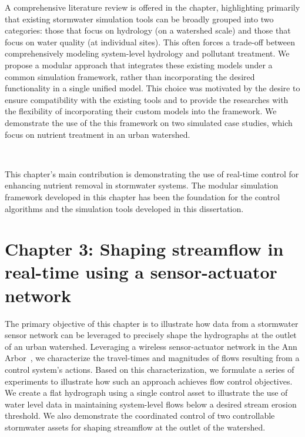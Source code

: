 A comprehensive literature review is offered in the chapter, highlighting primarily that existing stormwater simulation tools can be broadly grouped into two categories: those that focus on hydrology (on a watershed scale)\cite{Rossman2010Storm5.1} and those that focus on water quality (at individual sites)\cite{Langergraber2009CWM1:Wetlands}.
This often forces a trade-off between comprehensively modeling system-level hydrology and pollutant treatment.
We propose a modular approach that integrates these existing models under a common simulation framework, rather than incorporating the desired functionality in a single unified model.
This choice was motivated by the desire to ensure compatibility with the existing tools and to provide the researches with the flexibility of incorporating their custom models into the framework.
We demonstrate the use of the this framework on two simulated case studies, which focus on nutrient treatment in an urban watershed.

\

This chapter's main contribution is demonstrating the use of real-time control for enhancing nutrient removal in stormwater systems.
The modular simulation framework developed in this chapter has been the foundation for the control algorithms and the simulation tools developed in this dissertation. 

\section{Chapter 3: Shaping streamflow in real-time using a sensor-actuator network}

The primary objective of this chapter is to illustrate how data from a stormwater sensor network can be leveraged to precisely shape the hydrographs at the outlet of an urban watershed.
Leveraging a wireless sensor-actuator network in the Ann Arbor~\cite{Bartos_2018}, we characterize the travel-times and magnitudes of flows resulting from a control system's actions.
Based on this characterization, we formulate a series of experiments to illustrate how such an approach achieves flow control objectives.
We create a flat hydrograph using a single control asset to illustrate the use of water level data in maintaining system-level flows below a desired stream erosion threshold.
We also demonstrate the coordinated control of two controllable stormwater assets for shaping streamflow at the outlet of the watershed.

\


